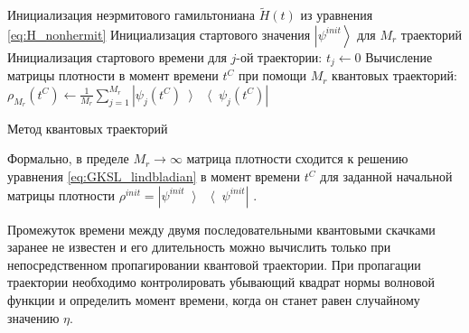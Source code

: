\IncMargin{1em}
\begin{algorithm}
	\SetAlgoLined
	
	Инициализация неэрмитового гамильтониана \(\tilde{H}(t)\) из уравнения \cref{eq:H_nonhermit}\;
	Инициализация стартового значения \( \left| \psi^{init} \right\rangle \) для \(M_r\) траекторий\;
	{
		Инициализация стартового времени для \(j\)-ой траектории: \(t_j\leftarrow0\)\;
	}
	Вычисление матрицы плотности в момент времени \(t^C\) при помощи \(M_r\) квантовых траекторий: \(\rho_{M_r}(t^C) \leftarrow \frac{1}{M_r}\sum_{j=1}^{M_r} \left| \psi_j (t^C) \left\rangle \right\langle \psi_j (t^C)  \right| \)\;
	
	\caption{Метод квантовых траекторий}
	\label{alg:qt_main}
\end{algorithm}
\DecMargin{1em}

Формально, в пределе \(M_r \rightarrow \infty\) матрица плотности сходится к решению уравнения \cref{eq:GKSL_lindbladian} в момент времени \(t^C\) для заданной начальной матрицы плотности \( \rho^{init} = \left| \psi^{init} \left\rangle \right\langle \psi^{init} \right|\) \cite{Breuer2007, Dum1992}.

Промежуток времени между двумя последовательными квантовыми скачками заранее не известен и его длительность можно вычислить только при непосредственном пропагировании квантовой траектории. 
При пропагации траектории необходимо контролировать убывающий квадрат нормы волновой функции и определить момент времени, когда он станет равен случайному значению \(\eta\).

